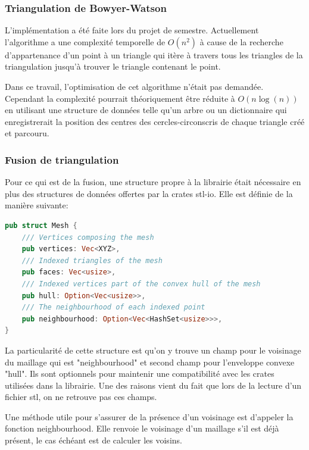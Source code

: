 \subsubsection{Triangulation de Bowyer-Watson}

L'implémentation a été faite lors du projet de semestre. 
Actuellement l'algorithme a une complexité temporelle de $O(n^2)$ à cause de la 
recherche d'appartenance d'un point à un triangle qui itère à travers tous les
triangles de la triangulation jusqu'à trouver le triangle contenant le point.

Dans ce travail, l'optimisation de cet algorithme n'était pas demandée.
Cependant la complexité pourrait théoriquement être réduite à $O(n \log(n))$ en
utilisant une structure de données telle qu'un arbre ou un dictionnaire
qui enregistrerait la position des centres des
cercles-circonscris de chaque triangle créé et parcouru.

\subsubsection{Fusion de triangulation}

Pour ce qui est de la fusion, une structure propre à la librairie était nécessaire en plus des structures de données offertes par la crates stl-io.
Elle est définie de la manière suivante:

\begin{lstlisting}[language=Rust, style=boxed]
pub struct Mesh {
    /// Vertices composing the mesh
    pub vertices: Vec<XYZ>,
    /// Indexed triangles of the mesh
    pub faces: Vec<usize>,
    /// Indexed vertices part of the convex hull of the mesh
    pub hull: Option<Vec<usize>>,
    /// The neighbourhood of each indexed point
    pub neighbourhood: Option<Vec<HashSet<usize>>>,
}
\end{lstlisting}

La particularité de cette structure est qu'on y trouve un champ pour le voisinage du maillage qui est "neighbourhood" et second champ pour l'enveloppe convexe "hull".
Ils sont optionnels pour maintenir une compatibilité avec les crates utilisées dans la librairie.
Une des raisons vient du fait que lors de la lecture d'un fichier \gls{stl}, on ne retrouve pas ces champs. 

Une méthode utile pour s'assurer de la présence d'un voisinage est d'appeler la fonction neighbourhood.
Elle renvoie le voisinage d'un maillage s'il est déjà présent, le cas échéant est de calculer les voisins.

